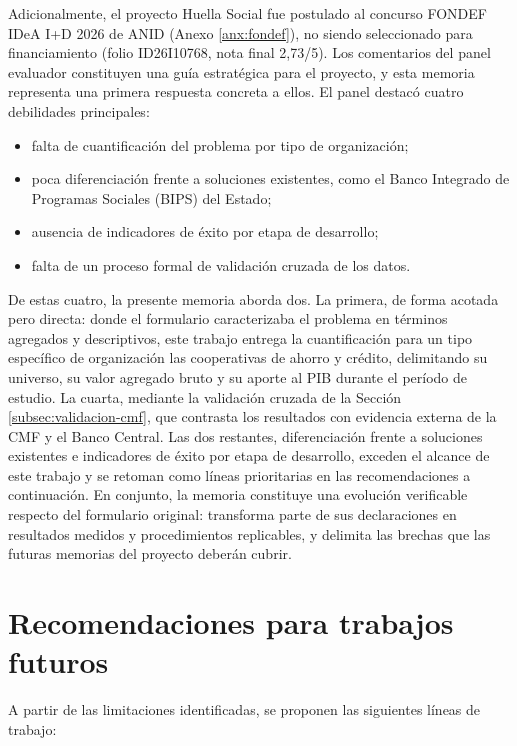 Adicionalmente, el proyecto Huella Social fue postulado al concurso FONDEF IDeA I+D 2026 de ANID (Anexo \ref{anx:fondef}), no siendo seleccionado para financiamiento (folio ID26I10768, nota final 2,73/5). Los comentarios del panel evaluador constituyen una guía estratégica para el proyecto, y esta memoria representa una primera respuesta concreta a ellos. El panel destacó cuatro debilidades principales:

\begin{itemize}
    \item falta de cuantificación del problema por tipo de organización;
    \item poca diferenciación frente a soluciones existentes, como el
    Banco Integrado de Programas Sociales (BIPS) del Estado;
    \item ausencia de indicadores de éxito por etapa de desarrollo;
    \item falta de un proceso formal de validación cruzada de los datos.
\end{itemize}

De estas cuatro, la presente memoria aborda dos. La primera, de forma acotada pero directa: donde el formulario caracterizaba el problema en términos agregados y descriptivos, este trabajo entrega la cuantificación para un tipo específico de organización las cooperativas de ahorro y crédito, delimitando su universo, su valor agregado bruto y su aporte al PIB durante el período de estudio. La cuarta, mediante la validación cruzada de la Sección \ref{subsec:validacion-cmf}, que contrasta los resultados con evidencia externa de la CMF y el Banco Central. Las dos restantes, diferenciación frente a soluciones existentes e indicadores de éxito por etapa de desarrollo, exceden el alcance de este trabajo y se retoman como líneas prioritarias en las recomendaciones a continuación. En conjunto, la memoria constituye una evolución verificable respecto del formulario original: transforma parte de sus declaraciones en resultados medidos y procedimientos replicables, y delimita las brechas que las futuras memorias del proyecto deberán cubrir.

\section{Recomendaciones para trabajos futuros}

A partir de las limitaciones identificadas, se proponen las siguientes líneas de trabajo:

